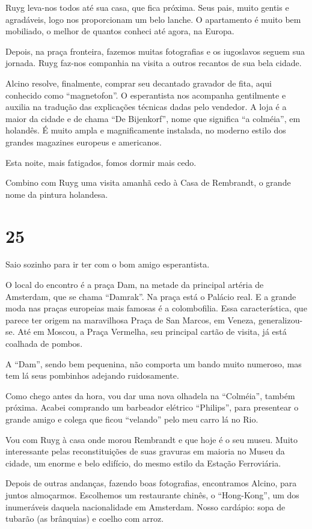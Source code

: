 Ruyg leva-nos todos até sua casa, que fica próxima. Seus pais, muito gentis e agradáveis, logo nos proporcionam um belo lanche. O apartamento é muito bem mobiliado, o melhor de quantos conheci até agora, na Europa.

Depois, na praça fronteira, fazemos muitas fotografias e os iugoslavos seguem sua jornada. Ruyg faz-nos companhia na visita a outros recantos de sua bela cidade.

Alcino resolve, finalmente, comprar seu decantado gravador de fita, aqui conhecido como “magnetofon”. O esperantista nos acompanha gentilmente e auxilia na tradução das explicações técnicas dadas pelo vendedor. A loja é a maior da cidade e de chama “De Bijenkorf”, nome que significa “a colméia”, em holandês. É muito ampla e magnificamente instalada, no moderno estilo dos grandes magazines europeus e americanos.

Esta noite, mais fatigados, fomos dormir mais cedo.

Combino com Ruyg uma visita amanhã cedo à Casa de Rembrandt, o grande nome da pintura holandesa.

\section*{25 \adfflatleafright {}}
Saio sozinho para ir ter com o bom amigo esperantista.

O local do encontro é a praça Dam, na metade da principal artéria de Amsterdam, que se chama “Damrak”. Na praça está o Palácio real. E a grande moda nas praças europeias mais famosas é a colombofilia. Essa característica, que parece ter origem na maravilhosa Praça de San Marcos, em Veneza, generalizou-se. Até em Moscou, a Praça Vermelha, seu principal cartão de visita, já está coalhada de pombos.

A “Dam”, sendo bem pequenina, não comporta um bando muito numeroso, mas tem lá seus pombinhos adejando ruidosamente.

Como chego antes da hora, vou dar uma nova olhadela na “Colméia”, também próxima. Acabei comprando um barbeador elétrico “Philips”, para presentear o grande amigo e colega que ficou “velando” pelo meu carro lá no Rio.

Vou com Ruyg à casa onde morou Rembrandt e que hoje é o seu museu. Muito interessante pelas reconstituições de suas gravuras em maioria no Museu da cidade, um enorme e belo edifício, do mesmo estilo da Estação Ferroviária.

Depois de outras andanças, fazendo boas fotografias, encontramos Alcino, para juntos almoçarmos. Escolhemos um restaurante chinês, o “Hong-Kong”, um dos inumeráveis daquela nacionalidade em Amsterdam. Nosso cardápio: sopa de tubarão (as brânquias) e coelho com arroz.

